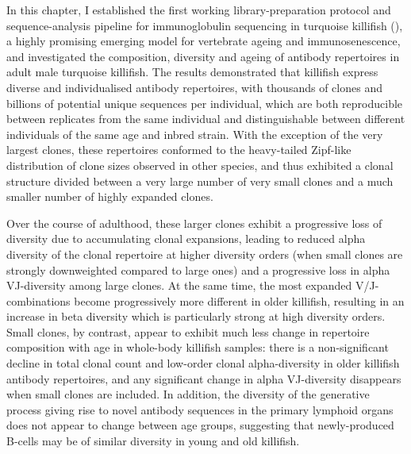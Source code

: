 In this chapter, I established the first working library-preparation protocol and sequence-analysis pipeline for immunoglobulin sequencing in turquoise killifish (\nfu), a highly promising emerging model for vertebrate ageing and immunosenescence, and investigated the composition, diversity and ageing of antibody repertoires in adult male turquoise killifish. The results demonstrated that killifish express diverse and individualised antibody repertoires, with thousands of clones and billions of potential unique sequences per individual, which are both reproducible between replicates from the same individual and distinguishable between different individuals of the same age and inbred strain. With the exception of the very largest clones, these repertoires conformed to the heavy-tailed Zipf-like distribution of clone sizes observed in other species, and thus exhibited a clonal structure divided between a very large number of very small clones and a much smaller number of highly expanded clones.

Over the course of adulthood, these larger clones exhibit a progressive loss of diversity due to accumulating clonal expansions, leading to reduced alpha diversity of the clonal repertoire at higher diversity orders (when small clones are strongly downweighted compared to large ones) and a progressive loss in alpha VJ-diversity among large clones. At the same time, the most expanded V/J-combinations become progressively more different in older killifish, resulting in an increase in beta diversity which is particularly strong at high diversity orders. Small clones, by contrast, appear to exhibit much less change in repertoire composition with age in whole-body killifish samples: there is a non-significant decline in total clonal count and low-order clonal alpha-diversity in older killifish antibody repertoires, and any significant change in alpha VJ-diversity disappears when small clones are included. In addition, the diversity of the generative process giving rise to novel antibody sequences in the primary lymphoid organs does not appear to change between age groups, suggesting that newly-produced \naive B-cells may be of similar diversity in young and old killifish.

